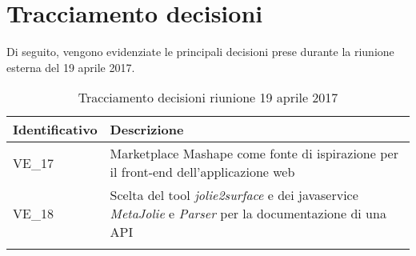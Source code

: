 \section{Tracciamento decisioni}
Di seguito, vengono evidenziate le principali decisioni prese durante la riunione esterna del 19 aprile 2017.

\begin{longtable}{|>{\centering\arraybackslash}p{4cm}|>{\centering\arraybackslash}p{9cm}|}
	\hline \rowcolor{Gray}
	\textbf{Identificativo} & \textbf{Descrizione}\\
	\hline
	\endhead
			VE\_17	&  Marketplace Mashape come fonte di ispirazione per il front-end dell'applicazione web \\
			\hline
			VE\_18 &  Scelta del tool \textit{jolie2surface} e dei javaservice \textit{MetaJolie} e \textit{Parser} per la documentazione di una API\\
			\hline
		\caption{Tracciamento decisioni riunione 19 aprile 2017}
\end{longtable}